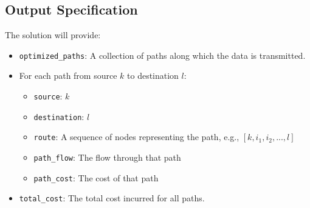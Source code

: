 \documentclass{article}
\begin{document}
\subsection*{Output Specification}
The solution will provide:
\begin{itemize}
    \item \texttt{optimized\_paths}: A collection of paths along which the data is transmitted.
    \item For each path from source \( k \) to destination \( l \):
    \begin{itemize}
        \item \texttt{source}: \( k \)
        \item \texttt{destination}: \( l \)
        \item \texttt{route}: A sequence of nodes representing the path, e.g., \([k, i_1, i_2, ..., l]\)
        \item \texttt{path\_flow}: The flow through that path
        \item \texttt{path\_cost}: The cost of that path
    \end{itemize}
    \item \texttt{total\_cost}: The total cost incurred for all paths.
\end{itemize}
\end{document}
